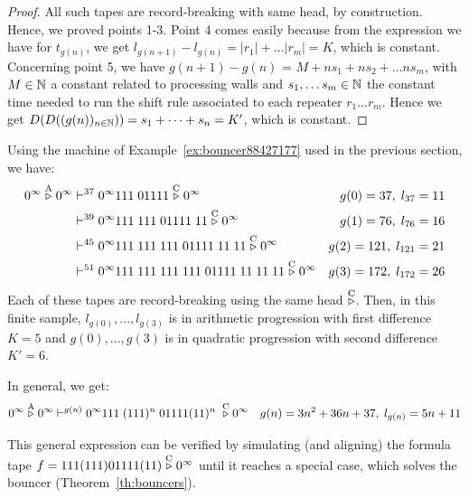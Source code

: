 \begin{proof}
    All such tapes are record-breaking with same head, by construction. Hence, we proved points 1-3. Point 4 comes easily because from the expression we have for $t_{g(n)}$, we get $l_{g(n+1)} - l_{g(n)} = |r_1| + \dots |r_m| = K$, which is constant. Concerning point 5, we have $g(n+1)-g(n)$ = $M + ns_1 + ns_2 + \dots ns_m$, with $M\in\mathbb{N}$ a constant related to processing walls and $s_1, \dots s_m \in \mathbb{N}$ the constant time needed to run the shift rule associated to each repeater $r_1 \dots r_m$. Hence we get $D(D((g(n))_{n\in\mathbb{N}})) = s_1+\dots + s_n = K'$, which is constant.


\end{proof}


\begin{example}\label{ex:linquad}
    Using the machine of Example~\ref{ex:bouncer88427177} used in the previous section, we have:
    \begin{align*}
        0^\infty \stackrel{\text{A}}\triangleright 0^\infty & \vdash^{37} 0^\infty 111\; 01111 \stackrel{\text{C}}\triangleright 0^\infty                                 & g(0) = 37,\; l_{37} = 11   \\
                                           & \vdash^{39}   0^\infty111\; 111 \;01111 \;11\stackrel{\text{C}}\triangleright0^\infty                       & g(1) = 76,\; l_{76} = 16   \\
                                           & \vdash^{45}   0^\infty111\; 111\;111\; 01111\; 11\; 11 \stackrel{\text{C}}\triangleright0^\infty            & g(2) = 121,\; l_{121} = 21 \\
                                           & \vdash^{51}   0^\infty111\; 111\;111\; 111\; 01111\; 11\; 11\; 11 \stackrel{\text{C}}\triangleright0^\infty & g(3) = 172,\; l_{172} = 26 \\
    \end{align*}
    Each of these tapes are record-breaking using the same head $\stackrel{\text{C}}\triangleright$. Then, in this finite sample, $l_{g(0)},...,l_{g(3)}$ is in arithmetic progression with first difference $K=5$ and $g(0), ..., g(3)$ is in quadratic progression with second difference $K'=6$.

    In general, we get:
    $$0^\infty \stackrel{\text{A}}\triangleright 0^\infty  \vdash^{g(n)} 0^\infty 111\; (111)^n\; 01111 (11)^n\; \stackrel{\text{C}}\triangleright 0^\infty   \quad g(n) = 3n^2 + 36n + 37,\; l_{g(n)} = 5n+11$$

    This general expression can be verified by simulating (and aligning) the formula tape $f=111(111)01111(11)\stackrel{\text{C}}\triangleright0^\infty$ until it reaches a special case, which solves the bouncer (Theorem~\ref{th:bouncers}).

\end{example}
\newpage
